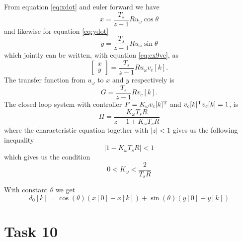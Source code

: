 \documentclass[a4paper,12pt,oneside,onecolumn]{article} %
\begin{document}
From equation \eqref{eq:xdot} and euler forward we have
\begin{equation}
x = \frac{T_s}{z-1}R u_\omega \cos \theta
\end{equation}
and likewise for equation \eqref{eq:ydot}
\begin{equation}
y = \frac{T_s}{z-1}R u_\omega \sin \theta
\end{equation}
which jointly can be written, with	 equation \eqref{eq:ex9vc}, as
\begin{equation}
\begin{bmatrix}
x\\y
\end{bmatrix}
= \frac{T_s}{z-1} R u_\omega v_c[k].
\end{equation}
The transfer function from $u_\omega$ to $x$ and $y$ respectively is
\begin{equation}
G = \frac{T_s}{z-1} R v_c[k].
\end{equation}
The closed loop system with controller $F = K_\omega v_c[k]^{\rm T}$ and $v_c[k]^{\rm T} v_c[k] = 1$, is
\begin{equation}
H = \frac{K_\omega T_s R}{z - 1 + K_\omega  T_s R}
\end{equation}
where the characteristic equation together with $\vert z \vert < 1$ gives us the following inequality
\begin{equation}
\mid 1 - K_\omega T_s R \mid < 1
\end{equation}
which gives us the condition
\begin{equation}
0 < K_\omega < \frac{2}{T_sR}
\end{equation}

With constant $\theta$ we get 
\begin{equation}
d_0[k] = \cos(\theta)(x[0] - x[k]) + \sin(\theta)(y[0] - y[k])
\end{equation}

\section*{Task 10}
\end{document}
